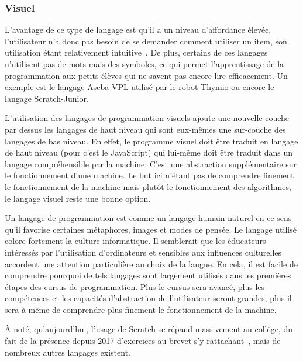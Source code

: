         \subsubsection{Visuel}
            L'avantage de ce type de langage est qu'il a un niveau d'affordance élevée, l'utilisateur n'a donc pas besoin de se demander comment utiliser un item, son utilisation étant relativement intuitive~. De plus, certains de ces langages n'utilisent pas de mots mais des symboles, ce qui permet l'apprentissage de la programmation aux petits élèves qui ne savent pas encore lire efficacement. Un exemple est le langage Aseba-VPL utilisé par le robot Thymio ou encore le langage Scratch-Junior.\par%
            L'utilisation des langages de programmation visuels ajoute une nouvelle couche par dessus les langages de haut niveau qui sont eux-mêmes une sur-couche des langages de bas niveau. En effet, le programme visuel doit être traduit en langage de haut niveau (pour  c'est le JavaScript) qui lui-même doit être traduit dans un langage compréhensible par la machine. C'est une abstraction supplémentaire sur le fonctionnement d'une machine. Le but ici n'étant pas de comprendre finement le fonctionnement de la machine mais plutôt le fonctionnement des algorithmes, le langage visuel reste une bonne option.
           \par%
            Un langage de programmation est comme un langage humain naturel en ce sens qu'il favorise certaines métaphores, images et modes de pensée. Le langage utilisé colore fortement la culture informatique. Il semblerait que les éducateurs intéressés par l’utilisation d’ordinateurs et sensibles aux influences culturelles accordent une attention particulière au choix de la langue. En cela, il est facile de comprendre pourquoi de tels langages sont largement utilisés dans les premières étapes des cursus de programmation. Plus le cursus sera avancé, plus les compétences et les capacités d'abstraction de l'utilisateur seront grandes, plus il sera à même de comprendre plus finement le fonctionnement de la machine.\par%
            À noté, qu'aujourd'hui, l'usage de Scratch se répand massivement au collège, du fait de la présence depuis 2017 d'exercices au brevet s'y rattachant~, mais de nombreux autres langages existent.
